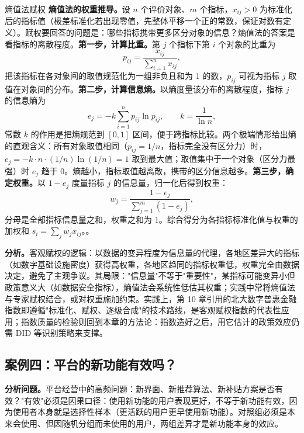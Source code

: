 \begin{derivation}{熵值法赋权}{}
\textbf{熵值法的权重推导。}设 $n$ 个评价对象、$m$ 个指标，$x_{ij} > 0$ 为标准化后的指标值（极差标准化若出现零值，先整体平移一个正的常数，保证对数有定义）。赋权要回答的问题是：哪些指标携带更多区分对象的信息？熵值法的答案是看指标的离散程度。\textbf{第一步，计算比重。}第 $j$ 个指标下第 $i$ 个对象的比重为
\[
p_{ij} = \frac{x_{ij}}{\sum_{i=1}^{n} x_{ij}},
\]
把该指标在各对象间的取值规范化为一组非负且和为 1 的数，$p_{ij}$ 可视为指标 $j$ 取值在对象间的分布。\textbf{第二步，计算信息熵。}以熵度量该分布的离散程度，指标 $j$ 的信息熵为
\[
e_j = -k \sum_{i=1}^{n} p_{ij} \ln p_{ij}, \qquad k = \frac{1}{\ln n},
\]
常数 $k$ 的作用是把熵规范到 $[0,1]$ 区间，便于跨指标比较。两个极端情形给出熵的直观含义：所有对象取值相同（$p_{ij} = 1/n$，指标完全没有区分力）时，$e_j = -k \cdot n \cdot (1/n)\ln(1/n) = 1$ 取到最大值；取值集中于一个对象（区分力最强）时 $e_j$ 趋于 0。熵越小，指标取值越离散，携带的区分信息越多。\textbf{第三步，确定权重。}以 $1 - e_j$ 度量指标 $j$ 的信息量，归一化后得到权重：
\[
w_j = \frac{1 - e_j}{\sum_{j=1}^{m} (1 - e_j)},
\]
分母是全部指标信息量之和，权重之和为 1。综合得分为各指标标准化值与权重的加权和 $s_i = \sum_j w_j x_{ij}$。。
\end{derivation}

\textbf{分析。}客观赋权的逻辑：以数据的变异程度为信息量的代理，各地区差异大的指标（如数字基础设施密度）获得高权重，各地区趋同的指标权重低，权重完全由数据决定，避免了主观争议。其局限："信息量"不等于"重要性"，某指标可能变异小但政策意义大（如数据安全指标），熵值法会系统性低估其权重；实践中常将熵值法与专家赋权结合，或对权重施加约束。实践上，第 10 章引用的北大数字普惠金融指数即遵循"标准化、赋权、逐级合成"的技术路线，是客观赋权指数的代表性应用；指数质量的检验则回到本章的方法论：指数造好之后，用它估计的政策效应仍需 DID 等识别策略来支撑。

\subsection{案例四：平台的新功能有效吗？}

\textbf{分析问题。}平台经营中的高频问题：新界面、新推荐算法、新补贴方案是否有效？"有效"必须是因果口径：使用新功能的用户表现更好，不等于新功能有效，因为使用者本身就是选择性样本（更活跃的用户更早使用新功能）。对照组必须是本来会使用、但因随机分组而未使用的用户，两组差异才是新功能本身的效应。

